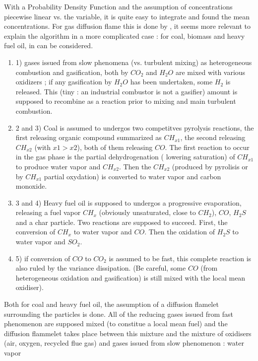 With a Probability Density Function and the assumption of concentrations
piecewise linear vs. the variable, it is quite easy to integrate and found the
mean concentrations. For gas diffusion flame this is done by , it seems more relevant to explain the algorithm in a more complicated
case : for coal, biomass and heavy fuel oil, in  can be considered.
\begin{enumerate}
\item 1) gases issued from slow phenomena (vs. turbulent mixing) as
  heterogeneous combustion and gasification, both by $CO_{2}$ and $H_{2}O$ are
  mixed with various oxidizers ; if any gasification by $H_{2}O$ has been
  undertaken, some $H_{2}$ is released. This (tiny : an industrial combustor is
  not a gasifier) amount is supposed to recombine as a reaction prior to mixing
  and main turbulent combustion.
\item 2 and 3) Coal is assumed to undergos two competitves pyrolysis reactions,
  the first releasing organic compound summarized as $CH_{x1}$, the second
  releasing $CH_{x2}$ (with $x1 > x2$), both of them releasing $CO$. The first
  reaction to occur in the gas phase is the partial dehydrogenation ( lowering
  saturation) of $CH_{x1}$ to produce water vapor and $CH_{x2}$. Then the
  $CH_{x2}$ (produced by pyrolisis or by $CH_{x1}$ partial oxydation) is
  converted to water vapor and carbon monoxide.
\item 3 and 4) Heavy fuel oil is supposed to undergos a progressive evaporation,
  releasing a fuel vapor $CH_{x}$ (obviously unsaturated, close to $CH_{2}$),
  $CO$, $H_{2}S$ and a char particle. Two reactions are supposed to
  succeed. First, the conversion of $CH_{x}$ to water vapor and $CO$. Then the
  oxidation of $H_{2}S$ to water vapor and $SO_{2}$.
\item 5) if conversion of $CO$ to $CO_{2}$ is assumed to be fast, this complete
  reaction is also ruled by the variance dissipation. (Be careful, some $CO$
  (from heterogeneous oxidation and gasification) is still mixed with the local
  mean oxidiser).
\end{enumerate}
Both for coal and heavy fuel oil, the assumption of a diffusion flamelet
surrounding the particles is done. All of the reducing gases issued from fast
phenomenon are supposed mixed (to constitue a local mean fuel) and the diffusion
flammelet takes place between this mixture and the mixture of oxidisers (air,
oxygen, recycled flue gas) and gases issued from slow phenomenon : water vapor

